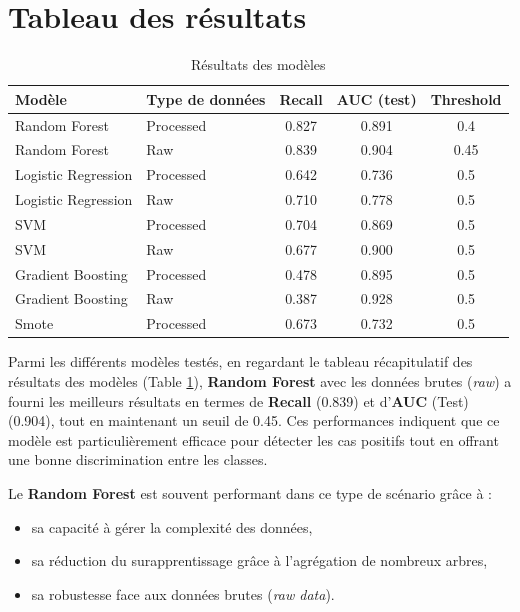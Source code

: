 \documentclass[a4paper,12pt]{report}
\begin{document}
\section{Tableau des résultats}

\begin{table}[h!]
  \centering
  \begin{tabular}{|l|l|c|c|c|}
  \hline
  \textbf{Modèle} & \textbf{Type de données} & \textbf{Recall} & \textbf{AUC (test)} & \textbf{Threshold} \\
  \hline
  Random Forest & Processed & 0.827 & 0.891 & 0.4 \\
  Random Forest & Raw & 0.839 & 0.904 & 0.45 \\
  Logistic Regression & Processed & 0.642 & 0.736 & 0.5 \\
  Logistic Regression & Raw & 0.710 & 0.778 & 0.5 \\
  SVM & Processed & 0.704 & 0.869 & 0.5 \\
  SVM & Raw & 0.677 & 0.900 & 0.5 \\
  Gradient Boosting & Processed & 0.478 & 0.895 & 0.5 \\
  Gradient Boosting & Raw & 0.387 & 0.928 & 0.5 \\
  Smote & Processed & 0.673 & 0.732 & 0.5 \\
  \hline
  \end{tabular}
  \caption{Résultats des modèles}
  \label{tab:results_models}
\end{table}

Parmi les différents modèles testés, en regardant le tableau récapitulatif des résultats des modèles (Table \ref{tab:results_models}), \textbf{Random Forest} avec les données brutes (\textit{raw}) a fourni les meilleurs résultats en termes de \textbf{Recall} (0.839) et d'\textbf{AUC} (Test) (0.904), tout en maintenant un seuil de 0.45. Ces performances indiquent que ce modèle est particulièrement efficace pour détecter les cas positifs tout en offrant une bonne discrimination entre les classes. 

Le \textbf{Random Forest} est souvent performant dans ce type de scénario grâce à :
\begin{itemize}
    \item sa capacité à gérer la complexité des données,
    \item sa réduction du surapprentissage grâce à l’agrégation de nombreux arbres,
    \item sa robustesse face aux données brutes (\textit{raw data}).
\end{itemize}
\end{document}
